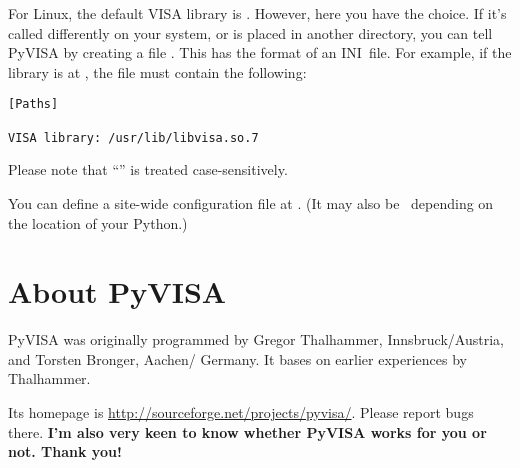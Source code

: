\documentclass{howto}
\begin{document}
For Linux, the default VISA library is
.  However, here you have the
choice.  If it's called differently on your system, or is placed in another
directory, you can tell PyVISA by creating a file .  This has
the format of an INI~file.  For example, if the library is at
, the file  must contain the
following:
\begin{verbatim}
[Paths]

VISA library: /usr/lib/libvisa.so.7
\end{verbatim}
Please note that ``\code{[Paths]}'' is treated case-sensitively.

You can define a site-wide configuration file at
.  (It may also be \
depending on the location of your Python.)


\section{About PyVISA}

PyVISA was originally programmed by Gregor Thalhammer, Innsbruck/Austria, and
Torsten Bronger, Aachen/\hskip0pt Germany.  It bases on earlier experiences by
Thalhammer.

Its homepage is \url{http://sourceforge.net/projects/pyvisa/}.  Please report
bugs there.  \textbf{I'm also very keen to know whether PyVISA works for you or
  not.  Thank you!}
\end{document}
